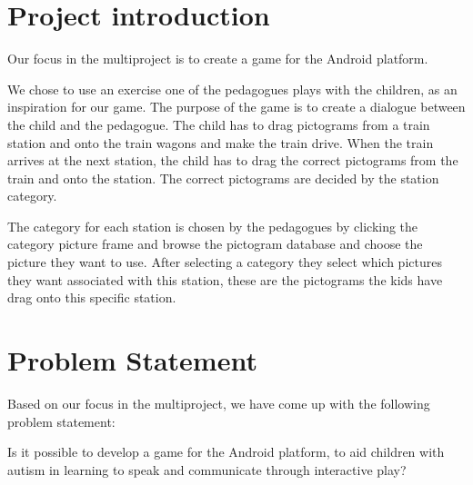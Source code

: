 \section*{Project introduction}

Our focus in the multiproject is to create a game for the Android platform. 

We chose to use an exercise one of the pedagogues plays with the children, as an inspiration for our game. The purpose of the game is to create a dialogue between the child and the pedagogue. The child has to drag pictograms from a train station and onto the train wagons and make the train drive. When the train arrives at the next station, the child has to drag the correct pictograms from the train and onto the station. The correct pictograms are decided by the station category. 

The category for each station is chosen by the pedagogues by clicking the category picture frame and browse the pictogram database and choose the picture they want to use. After selecting a category they select which pictures they want associated with this station, these are the pictograms the kids have drag onto this specific station. 

\section*{Problem Statement}

Based on our focus in the multiproject, we have come up with the following problem statement:

Is it possible to develop a game for the Android platform, to aid children with autism in learning to speak and communicate through interactive play?
